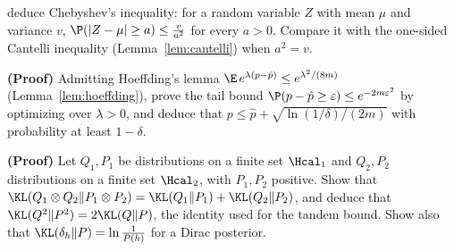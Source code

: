 \begin{exercises}
\begin{exercise}
deduce Chebyshev's inequality: for a random variable $Z$ with mean $\mu$ and
variance $v$, $\P(|Z-\mu|\geq a)\leq\frac{v}{a^2}$ for every $a>0$. Compare it with the
one-sided Cantelli inequality (Lemma~\ref{lem:cantelli}) when $a^2=v$.
\end{exercise}
\begin{exercise}
\textbf{(Proof)} Admitting Hoeffding's lemma
$\E\,e^{\lambda(p-\hat p)}\leq e^{\lambda^2/(8m)}$ (Lemma~\ref{lem:hoeffding}), prove the tail bound
$\P(p-\hat p\geq\varepsilon)\leq e^{-2m\varepsilon^2}$ by optimizing over $\lambda>0$, and deduce that
$p\leq\hat p+\sqrt{\ln(1/\delta)/(2m)}$ with probability at least $1-\delta$.
\end{exercise}
\begin{exercise}
\textbf{(Proof)} Let $Q_1,P_1$ be distributions on a finite set $\Hcal_1$ and
$Q_2,P_2$ distributions on a finite set $\Hcal_2$, with $P_1,P_2$ positive. Show that
$\KL(Q_1\otimes Q_2\|P_1\otimes P_2)=\KL(Q_1\|P_1)+\KL(Q_2\|P_2)$, and deduce that
$\KL(Q^2\|P^2)=2\KL(Q\|P)$, the identity used for the tandem bound. Show also that
$\KL(\delta_h\|P)=\ln\frac1{P(h)}$ for a Dirac posterior.
\end{exercise}
\end{exercises}
